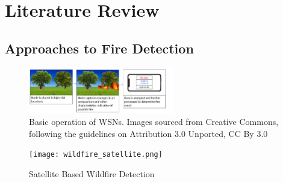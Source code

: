 \documentclass[lettersize,journal]{IEEEtran}
\begin{document}


\section{Literature Review}

\subsection{Approaches to Fire Detection}


\begin{figure}
        \centering
        \includegraphics[width=2.5in]{sensornode.png}
        \caption{Basic operation of WSNs. Images sourced from Creative Commons,
        following the guidelines on Attribution 3.0 Unported, CC By 3.0}
\end{figure}

\begin{figure}
        \centering
        \texttt{[image: wildfire\_satellite.png]}
        \caption{Satellite Based Wildfire Detection}
\end{figure}
\end{document}
